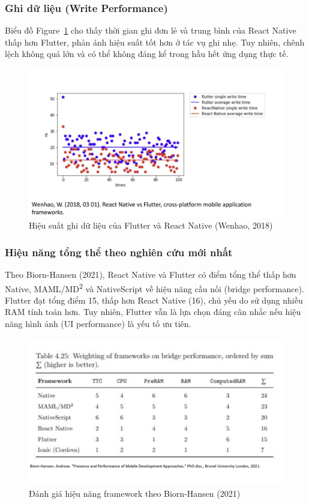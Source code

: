 \subsubsection{Ghi dữ liệu (Write Performance)}
\begin{flushleft}
  \hspace*{0.8cm}Biểu đồ Figure~\ref{fig:write} cho thấy thời gian ghi đơn lẻ và trung bình của React Native thấp hơn Flutter, phản ánh hiệu suất tốt hơn ở tác vụ ghi nhẹ. Tuy nhiên, chênh lệch không quá lớn và có thể không đáng kể trong hầu hết ứng dụng thực tế.
\end{flushleft}

\begin{figure}[H]
    \centering
    \includegraphics[width=0.8\linewidth]{images/read_write.png}
    \caption{Hiệu suất ghi dữ liệu của Flutter và React Native (Wenhao, 2018)}
    \label{fig:write}
\end{figure}

\subsubsection{Hiệu năng tổng thể theo nghiên cứu mới nhất}
\begin{flushleft}
  \hspace*{0.8cm}Theo Biorn-Hansen (2021), React Native và Flutter có điểm tổng thể thấp hơn Native, MAML/MD\textsuperscript{2} và NativeScript về hiệu năng cầu nối (bridge performance). Flutter đạt tổng điểm 15, thấp hơn React Native (16), chủ yếu do sử dụng nhiều RAM tính toán hơn. Tuy nhiên, Flutter vẫn là lựa chọn đáng cân nhắc nếu hiệu năng hình ảnh (UI performance) là yếu tố ưu tiên.
\end{flushleft}

\begin{figure}[H]
    \centering
    \includegraphics[width=0.7\linewidth]{images/performance.png}
    \caption{Đánh giá hiệu năng framework theo Biorn-Hansen (2021)}
    \label{fig:overall}
\end{figure}

